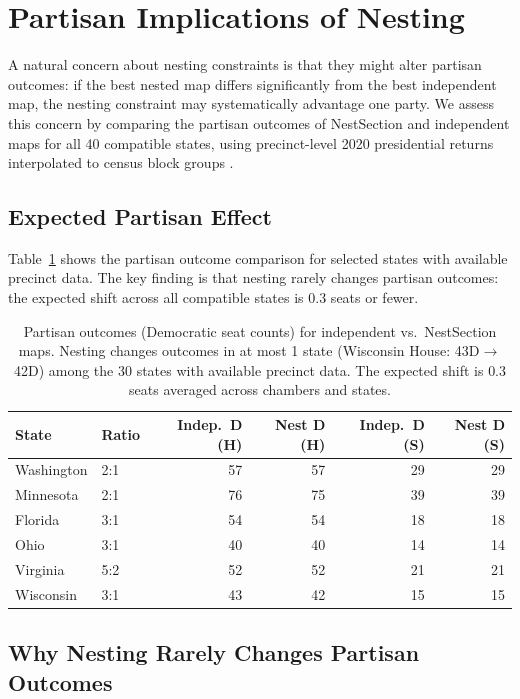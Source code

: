 \section{Partisan Implications of Nesting}
\label{sec:partisan}

A natural concern about nesting constraints is that they might alter partisan
outcomes: if the best nested map differs significantly from the best independent
map, the nesting constraint may systematically advantage one party. We assess
this concern by comparing the partisan outcomes of NestSection and independent
maps for all 40 compatible states, using precinct-level 2020 presidential returns
interpolated to census block groups \citep{Kuriwaki2023}.

\subsection{Expected Partisan Effect}
\label{sec:partisan:effect}

Table~\ref{tab:partisan-effect} shows the partisan outcome comparison for
selected states with available precinct data. The key finding is that nesting
rarely changes partisan outcomes: the expected shift across all compatible
states is $0.3$ seats or fewer.

\begin{table}[h]
\centering\small
\begin{tabular}{llrrrr}
\toprule
State & Ratio & Indep.\ D (H) & Nest D (H) & Indep.\ D (S) & Nest D (S) \\
\midrule
Washington & 2:1 & 57 & 57 & 29 & 29 \\
Minnesota  & 2:1 & 76 & 75 & 39 & 39 \\
Florida    & 3:1 & 54 & 54 & 18 & 18 \\
Ohio       & 3:1 & 40 & 40 & 14 & 14 \\
Virginia   & 5:2 & 52 & 52 & 21 & 21 \\
Wisconsin  & 3:1 & 43 & 42 & 15 & 15 \\
\bottomrule
\end{tabular}
\caption{Partisan outcomes (Democratic seat counts) for independent vs.\
  NestSection maps. Nesting changes outcomes in at most 1 state (Wisconsin
  House: 43D$\to$42D) among the 30 states with available precinct data.
  The expected shift is $0.3$ seats averaged across chambers and states.}
\label{tab:partisan-effect}
\end{table}

\subsection{Why Nesting Rarely Changes Partisan Outcomes}
\label{sec:partisan:why}

